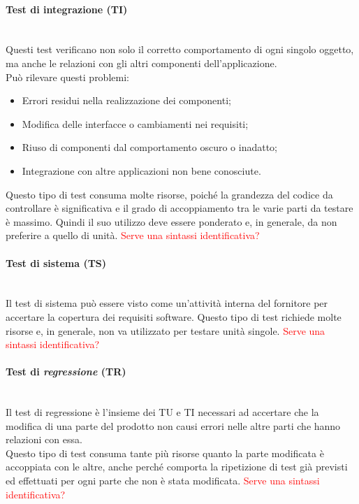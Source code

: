 		\paragraph{\textbf{Test di integrazione (TI)}}
		~\\Questi test verificano non solo il corretto comportamento di ogni singolo oggetto, 
		ma anche le relazioni con gli altri componenti dell'applicazione.
		~\\Può rilevare questi problemi:
		\begin{itemize}
			\item Errori residui nella realizzazione dei componenti;
			\item Modifica delle interfacce o cambiamenti nei requisiti;
			\item Riuso di componenti dal comportamento oscuro o inadatto;
			\item Integrazione con altre applicazioni non bene conosciute.
		\end{itemize}
		Questo tipo di test consuma molte risorse, poiché la grandezza del codice da controllare è 
		significativa e	il grado di accoppiamento tra le varie parti da testare è massimo. 
		Quindi il suo utilizzo deve essere ponderato e, in generale, da non preferire a quello di unità.
		\textcolor{red}{Serve una sintassi identificativa?}
		\paragraph{\textbf{Test di sistema (TS)}}
		~\\Il test di sistema può essere visto come un'attività interna del fornitore
		per accertare la copertura dei requisiti software.
		\newline{}Questo tipo di test richiede molte risorse e, in generale, non va utilizzato per testare
		unità singole.
		\textcolor{red}{Serve una sintassi identificativa?}
		\paragraph{\textbf{Test di \emph{regressione}} \textbf{(TR)}}
		~\\Il test di regressione è l'insieme dei TU e TI necessari ad accertare che la modifica
		di una parte del prodotto non causi errori nelle altre parti che hanno relazioni con essa.
		\\Questo tipo di test consuma tante più risorse quanto la parte modificata è accoppiata con le altre, 
		anche perché comporta la ripetizione di test già previsti ed effettuati per ogni parte che non è 
		stata modificata.
		\textcolor{red}{Serve una sintassi identificativa?}
